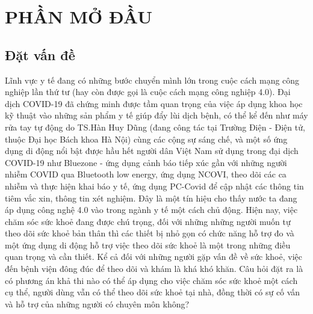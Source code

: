 
\section*{PHẦN MỞ ĐẦU}
\subsection*{Đặt vấn đề}
Lĩnh vực y tế đang có những bước chuyển mình lớn trong cuộc cách mạng công nghiệp lần thứ tư 
(hay còn được gọi là cuộc cách mạng công nghiệp 4.0). Đại dịch COVID-19 đã chứng minh được tầm quan trọng của việc áp dụng
khoa học kỹ thuật vào những sản phẩm y tế giúp đẩy lùi dịch bệnh,
có thể kể đến như máy rửa tay tự động do TS.Hàn Huy Dũng (đang công tác tại Trường Điện - Điện tử, thuộc Đại học Bách khoa Hà Nội) 
\cite{ref_thay_dzung} cùng các cộng sự sáng chế, và một số ứng dụng di động
nổi bật được hầu hết người dân Việt Nam sử dụng trong đại dịch COVID-19 như Bluezone - ứng dụng cảnh báo tiếp xúc gần với
những người nhiễm COVID qua Bluetooth low energy, ứng dụng NCOVI, theo dõi các ca nhiễm và thực hiện khai báo y tế, ứng
dụng PC-Covid để cập nhật các thông tin tiêm vắc xin, thông tin xét nghiệm. Đây là một tín hiệu cho thấy nước ta đang áp
dụng công nghệ 4.0 vào trong ngành y tế một cách chủ động. Hiện nay, việc chăm sóc sức khoẻ đang được chú trọng, đối với 
những những người muốn tự theo dõi sức khoẻ bản thân
thì các thiết bị nhỏ gọn có chức năng hỗ trợ đo và một ứng dụng di động hỗ trợ việc theo dõi sức khoẻ là một trong những
điều quan trọng và cần thiết. Kể cả đối với những người gặp vấn đề về sức khoẻ, việc đến bệnh viện đông đúc để theo dõi
và khám là khá khó khăn. Câu hỏi đặt ra là có phương án khả thi nào có thể áp dụng cho việc chăm sóc sức khoẻ một cách cụ thể, 
người dùng vẫn có thể theo dõi sức khoẻ tại nhà, đồng thời có sự cố vấn và hỗ trợ của những người có chuyên môn không?

